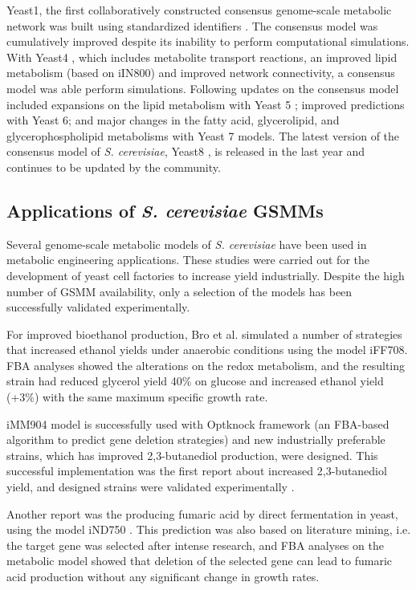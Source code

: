 \vspace{-0.6cm}

Yeast1, the first collaboratively constructed consensus genome-scale metabolic network was built using standardized identifiers \cite{herrgaard2008consensus}. The consensus model was cumulatively improved despite its inability to perform computational simulations. With Yeast4 \cite{dobson2010further}, which includes metabolite transport reactions, an improved lipid metabolism (based on iIN800) and improved network connectivity, a consensus model was able perform simulations. Following updates on the consensus model included expansions on the lipid metabolism with Yeast 5 \cite{heavner2012yeast}; improved predictions with Yeast 6\cite{heavner2013version}; and major changes in the fatty acid, glycerolipid, and glycerophospholipid metabolisms with Yeast 7 \cite{aung2013revising} models. The latest version of the consensus model of \emph{S. cerevisiae}, Yeast8 \cite{lu2019consensus}, is released in the last year and continues to be updated by the community.


\subsection{Applications of \emph{S. cerevisiae} GSMMs}
Several genome-scale metabolic models of \emph{S. cerevisiae} have been used in metabolic engineering applications. These studies were carried out for the development of yeast cell factories to increase yield industrially. Despite the high number of GSMM availability, only a selection of the models has been successfully validated experimentally.

For improved bioethanol production, Bro et al. simulated a number of strategies that increased ethanol yields under anaerobic conditions using the model 	iFF708\cite{bro2006silico}. FBA analyses showed the alterations on the redox metabolism, and the resulting strain had reduced glycerol yield 40\% on glucose and increased ethanol yield (+3\%) with the same maximum specific growth rate.

iMM904 model is successfully used with Optknock framework \cite{burgard2003optknock} (an FBA-based algorithm to predict gene deletion strategies) and new industrially preferable strains, which has improved 2,3-butanediol production, were designed. This successful implementation was the first report about increased 2,3-butanediol yield, and designed strains were validated experimentally \cite{ng2012production}.

Another report was the producing fumaric acid by direct fermentation in yeast, using the model iND750 \cite{xu2012fumaric}. This prediction was also based on literature mining, i.e. the target gene was selected after intense research, and FBA analyses on the metabolic model showed that deletion of the selected gene can lead to fumaric acid production without any significant change in growth rates.


